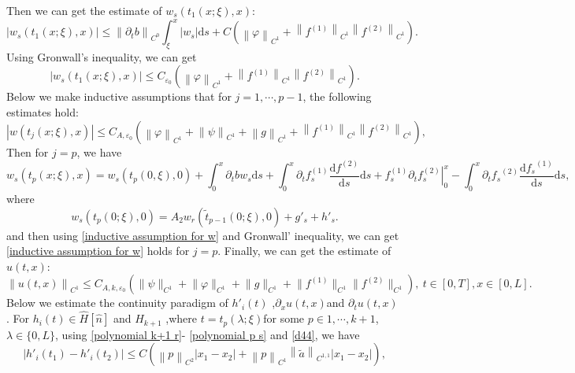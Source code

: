 \documentclass[a4paper,reqno,11pt]{amsart}
\numberwithin{equation}{section} %
\begin{document}
Then we can get the estimate of $w_s\left( t_1(x;\xi ),x \right) $:
$$
\left| w_s\left( t_1(x;\xi ),x \right) \right|\leq \left\| \partial _tb \right\| _{C^0}\int_{\xi}^x{\left| w_s \right|\mathrm{d}s}+C\left( \left\| \varphi \right\| _{C^1}+\left\| f^{(1)} \right\| _{C^1}\left\| f^{(2)} \right\| _{C^1} \right) .
$$
Using Gronwall's inequality, we can get
$$
\left| w_s\left( t_1(x;\xi ),x \right) \right|\leq C_{\varepsilon _0}\left( \left\| \varphi \right\| _{C^1}+\left\| f^{(1)} \right\| _{C^1}\left\| f^{(2)} \right\| _{C^1} \right) .
$$
Below we make inductive assumptions that for $j=1,\cdots,p-1$, the following estimates hold:
\begin{equation}\label{inductive assumption for w}
\left| w\left( t_j(x;\xi ),x \right) \right|\leq C_{A,\varepsilon _0}\left( \left\| \varphi \right\| _{C^1}+\left\| \psi \right\| _{C^1}+\left\| g \right\| _{C^1}+\left\| f^{(1)} \right\| _{C^1}\left\| f^{(2)} \right\| _{C^1} \right) ,
\end{equation}
Then for $j=p$, we have
\begin{equation}\label{e of w_s p}
	w_s\left( t_p(x;\xi ),x \right) =w_s(t_p(0,\xi ),0)+\int_{0}^x{\partial _tbw_s\mathrm{d}s}+\int_{0}^x{\partial _tf_{s}^{(1)}\frac{\mathrm{d}f^{(2)}}{\mathrm{d}s}\mathrm{d}s}+\left. f_{s}^{(1)}\partial _tf_{s}^{(2)} \right|_{0}^{x}-\int_{0}^x{\partial _t{f_s}^{(2)}\frac{\mathrm{d}{f_s}^{(1)}}{\mathrm{d}s}\mathrm{d}s},
\end{equation}
where
\begin{equation}\label{w_s at t_p(t,0)}
	w_s(t_p(0 ; \xi), 0)= A_2 w_r\left(\tilde{t}_{p-1}(0 ; \xi), 0\right)+g'_s+h'_s .
\end{equation}
and then using \eqref{inductive assumption for w} and Gronwall' inequality, we can get \eqref{inductive assumption for w} holds for $j=p$.
Finally, we can get the estimate of $u(t,x)$:
\begin{equation}\label{estimate of u}
	\left\| u(t,x) \right\|_{C^1} \leq C_{A,k,\varepsilon _0}(\lVert \psi \rVert _{C^1}+\lVert \varphi  \rVert _{C^1}+  \lVert g \rVert _{C^1}+\lVert f^{(1)} \rVert _{C^1}\lVert f^{(2)} \rVert _{C^1}) ,\ t\in [0,T], x\in [0,L].
\end{equation}
Below we estimate the continuity paradigm of  $h'_i(t) $ ,$\partial _x u(t,x)$and  $\partial _t u(t,x)$ .
For $h_i(t) \in \hat{H}\left[ \hat{n} \right] $ and $H_{k+1}$ ,where $t=t_p(\lambda;\xi)$for some $p \in 1,\cdots , k+1$, $\lambda \in \{ 0,L \} $, using \eqref{polynomial k+1 r}- \eqref{polynomial p s} and \eqref{d44}, we have
$$
\left| h' _i\left( t_1 \right) -h'_i\left( t_2 \right) \right|\leq C(\left\| p \right\| _{C^2}\left| x_1-x_2 \right|+\left\| p \right\| _{C^1}\left\| \tilde{a} \right\| _{C^{1,1}}\left| x_1-x_2 \right|),
$$
\end{document}
